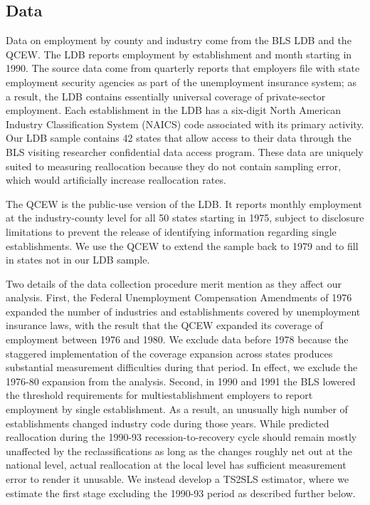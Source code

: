\documentclass[12pt]{article}
\theoremstyle{definition}
\begin{document}
\subsection{Data}

Data on employment by county and industry come from the BLS LDB and the QCEW. The LDB reports employment by establishment and month starting in 1990. The source data come from quarterly reports that employers file with state employment security agencies as part of the unemployment insurance system; as a result, the LDB contains essentially universal coverage of private-sector employment. Each establishment in the LDB has a six-digit North American Industry Classification System (NAICS) code associated with its primary activity. Our LDB sample contains 42 states that allow access to their data through the BLS visiting researcher confidential data access program. These data are uniquely suited to measuring reallocation because they do not contain sampling error, which would artificially increase reallocation rates.

The QCEW is the public-use version of the LDB. It reports monthly employment at the industry-county level for all 50 states starting in 1975, subject to disclosure limitations to prevent the release of identifying information regarding single establishments. We use the QCEW to extend the sample back to 1979 and to fill in states not in our LDB sample.

Two details of the data collection procedure merit mention as they affect our analysis. First, the Federal Unemployment Compensation Amendments of 1976 expanded the number of industries and establishments covered by unemployment insurance laws, with the result that the QCEW expanded its coverage of employment between 1976 and 1980. We exclude data before 1978 because the staggered implementation of the coverage expansion across states produces substantial measurement difficulties during that period. In effect, we exclude the 1976-80 expansion from the analysis. Second, in 1990 and 1991 the BLS lowered the threshold requirements for multiestablishment employers to report employment by single establishment. As a result, an unusually high number of establishments changed industry code during those years. While predicted reallocation during the 1990-93 recession-to-recovery cycle should remain mostly unaffected by the reclassifications as long as the changes roughly net out at the national level, actual reallocation at the local level has sufficient measurement error to render it unusable. We instead develop a TS2SLS estimator, where we estimate the first stage excluding the 1990-93 period as described further below.
\end{document}

